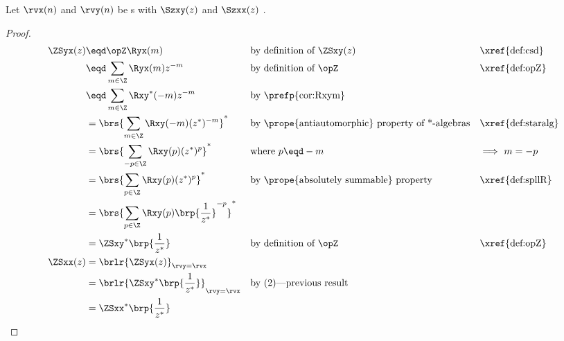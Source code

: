 \begin{theorem}
\label{thm:ZSxy_sym}
Let $\rvx(n)$ and $\rvy(n)$ be s 
with  $\Szxy(z)$ and  $\Szxx(z)$ .
\end{theorem}
\begin{proof}
\begin{align*}
  \ZSyx(z)
     &\eqd \opZ \Ryx(m)
    && \text{by definition of $\ZSxy(z)$}                          && \text{\xref{def:csd}}
  \\&\eqd \sum_{m\in\Z}\Ryx(m) z^{-m}
    && \text{by definition of $\opZ$}                              && \text{\xref{def:opZ}}
  \\&\eqd \sum_{m\in\Z} \Rxy^\ast(-m) z^{-m}
    && \text{by \prefp{cor:Rxym}}
  \\&= \brs{\sum_{m\in\Z} \Rxy(-m) (z^\ast)^{-m}}^\ast
    && \text{by \prope{antiautomorphic} property of *-algebras}    && \text{\xref{def:staralg}}
  \\&= \brs{\sum_{-p\in\Z} \Rxy(p) (z^\ast)^{p}}^\ast
    && \text{where $p\eqd -m$}                                     && \text{$\implies$ $m=-p$}
  \\&= \brs{\sum_{p\in\Z} \Rxy(p) (z^\ast)^{p}}^\ast
    && \text{by \prope{absolutely summable} property}              && \text{\xref{def:spllR}}
  \\&= \brs{\sum_{p\in\Z} \Rxy(p) \brp{\frac{1}{z^\ast}}^{-p}}^\ast
  \\&= \ZSxy^\ast\brp{\frac{1}{z^\ast}}
    && \text{by definition of $\opZ$}                              && \text{\xref{def:opZ}}
  \\
  \ZSxx(z)
    &= \brlr{\ZSyx(z)}_{\rvy=\rvx}
  \\&= \brlr{\ZSxy^\ast\brp{\frac{1}{z^\ast}}}_{\rvy=\rvx}
    && \text{by (2)---previous result}
  \\&= \ZSxx^\ast\brp{\frac{1}{z^\ast}}
\end{align*}
\end{proof}

